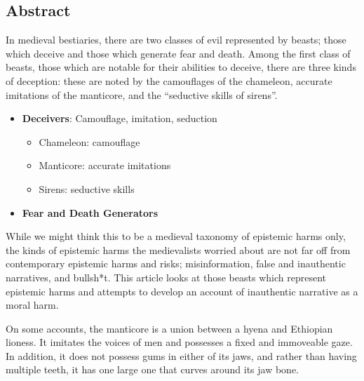 \documentclass[
  letterpaper,
  DIV=11,
  numbers=noendperiod]{scrreprt}
\providecommand{\tightlist}{%
  \setlength{\itemsep}{0pt}\setlength{\parskip}{0pt}}\usepackage{longtable,booktabs,array}
\begin{document}
\begin{tcolorbox}[enhanced jigsaw, arc=.35mm, breakable, rightrule=.15mm, colback=white, colframe=quarto-callout-important-color-frame, bottomrule=.15mm, leftrule=.75mm, opacityback=0, toprule=.15mm, left=2mm]
\begin{tcolorbox}[enhanced jigsaw, arc=.35mm, breakable, rightrule=.15mm, colback=white, colframe=quarto-callout-tip-color-frame, bottomrule=.15mm, leftrule=.75mm, opacityback=0, toprule=.15mm, left=2mm]
\section{Abstract}\label{abstract}

In medieval bestiaries, there are two classes of evil represented by
beasts; those which deceive and those which generate fear and death.
Among the first class of beasts, those which are notable for their
abilities to deceive, there are three kinds of deception: these are
noted by the camouflages of the chameleon, accurate imitations of the
manticore, and the ``seductive skills of sirens''.

\begin{itemize}
\tightlist
\item
  \textbf{Deceivers}: Camouflage, imitation, seduction

  \begin{itemize}
  \tightlist
  \item
    Chameleon: camouflage
  \item
    Manticore: accurate imitations
  \item
    Sirens: seductive skills
  \end{itemize}
\item
  \textbf{Fear and Death Generators}
\end{itemize}

While we might think this to be a medieval taxonomy of epistemic harms
only, the kinds of epistemic harms the medievalists worried about are
not far off from contemporary epistemic harms and risks; misinformation,
false and inauthentic narratives, and bullsh*t. This article looks at
those beasts which represent epistemic harms and attempts to develop an
account of inauthentic narrative as a moral harm.

On some accounts, the manticore is a union between a hyena and Ethiopian
lioness. It imitates the voices of men and possesses a fixed and
immoveable gaze. In addition, it does not possess gums in either of its
jaws, and rather than having multiple teeth, it has one large one that
curves around its jaw bone.


\end{tcolorbox}
\end{tcolorbox}
\end{document}
